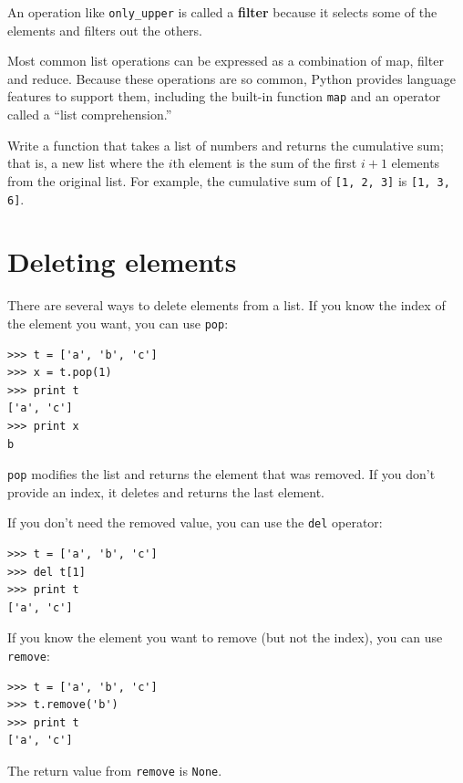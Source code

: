 \documentclass[10pt]{book}
\begin{document}
\begin{CJK}{UTF8}{gbsn}
An operation like \verb"only_upper" is called a {\bf filter} because
it selects some of the elements and filters out the others.

Most common list operations can be expressed as a combination
of map, filter and reduce.  Because these operations are
so common, Python provides language features to support them,
including the built-in function {\tt map} and an operator
called a ``list comprehension.''

\begin{exercise}
\label{cumulative}

Write a function that takes a list of numbers and returns the
cumulative sum; that is, a new list where the $i$th element
is the sum of the first $i+1$ elements from the original list.
For example, the cumulative sum of {\tt [1, 2, 3]} is
{\tt [1, 3, 6]}. 
\end{exercise}


\section{Deleting elements}

There are several ways to delete elements from a list.  If you
know the index of the element you want, you can use
{\tt pop}:

\begin{verbatim}
>>> t = ['a', 'b', 'c']
>>> x = t.pop(1)
>>> print t
['a', 'c']
>>> print x
b
\end{verbatim}
%
{\tt pop} modifies the list and returns the element that was removed.
If you don't provide an index, it deletes and returns the
last element.

If you don't need the removed value, you can use the {\tt del}
operator:

\begin{verbatim}
>>> t = ['a', 'b', 'c']
>>> del t[1]
>>> print t
['a', 'c']
\end{verbatim}
%

If you know the element you want to remove (but not the index), you
can use {\tt remove}:

\begin{verbatim}
>>> t = ['a', 'b', 'c']
>>> t.remove('b')
>>> print t
['a', 'c']
\end{verbatim}
%
The return value from {\tt remove} is {\tt None}.


\end{CJK}
\end{document}
